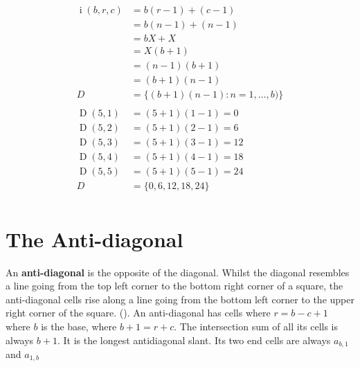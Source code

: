 \documentclass[twoside,openany,12pt]{book}
\begin{document}
    \begin{equation}
        \begin{split}
          \operatorname{i}(b,r,c) &= b(r-1)+(c-1) \\
                &= b(n-1)+(n-1) \\
                &= bX + X \\
                &= X(b + 1) \\
                &= (n-1)(b + 1) \\
                &= (b + 1)(n - 1) \\
            D &= \{ (b+1)(n-1) : n = 1, \dots, b) \} \\
            \\
            \operatorname{D}(5,1) &= (5+1)(1 - 1) =  0 \\
            \operatorname{D}(5,2) &= (5+1)(2 - 1) =  6 \\
            \operatorname{D}(5,3) &= (5+1)(3 - 1) =  12 \\
            \operatorname{D}(5,4) &= (5+1)(4 - 1) =  18 \\
            \operatorname{D}(5,5) &= (5+1)(5 - 1) =  24 \\
            D &= \{0, 6, 12, 18, 24 \} \\
        \end{split}
    \end{equation}

    \section{The Anti-diagonal} \label{antidiagonal}
    An \textbf{anti-diagonal} is the opposite of the diagonal. Whilst the diagonal resembles a line going from the top left corner to the bottom right corner of a square, the anti-diagonal cells rise along a line going from the bottom left corner to the upper right corner of the square. (\cite{matte_antidiagonal}).  An anti-diagonal has cells where $r = b - c + 1$ where $b$ is the base, where $b + 1 = r + c$. The intersection sum of all its cells is always $b + 1$. It is the longest antidiagonal slant. Its two end cells are always $a_{b,1}$ and $a_{1,b}$
\end{document}
